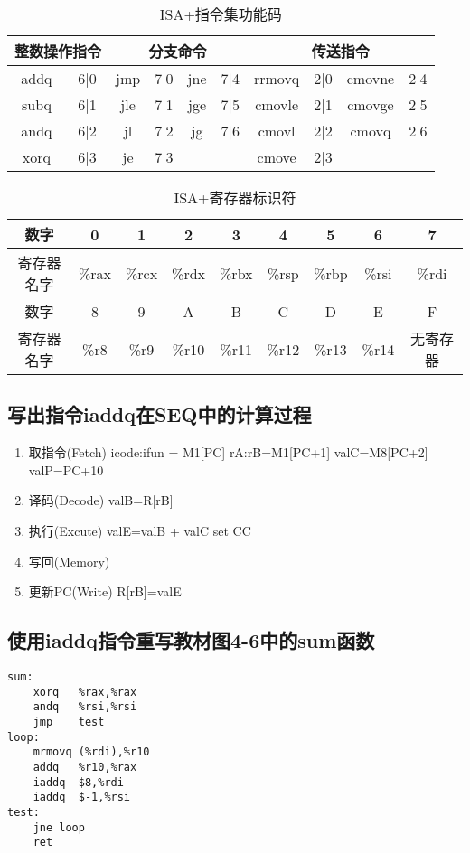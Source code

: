 \begin{table}[H]
    \centering
   \begin{tabular}{|c|c|c|c|c|c|c|c|c|c|}
       \hline 
       \multicolumn{2}{|c|}{整数操作指令} & \multicolumn{4}{|c|}{分支命令} & \multicolumn{4}{|c|}{传送指令} \\ 
       \hline 
       addq & 6|0 & jmp & 7|0 & jne & 7|4 & rrmovq & 2|0 & cmovne & 2|4 \\ 
       \hline 
       subq & 6|1 & jle & 7|1 & jge & 7|5 & cmovle & 2|1 & cmovge & 2|5 \\ 
       \hline 
       andq & 6|2 & jl & 7|2 & jg & 7|6 & cmovl & 2|2 & cmovq & 2|6 \\ 
       \hline 
       xorq & 6|3 & je & 7|3 &  &  & cmove & 2|3 &  &  \\ 
       \hline 
   \end{tabular} 
   \caption{ISA+指令集功能码}
\end{table}

\begin{table}[H]
    \centering
    \begin{tabular}{|c|c|c|c|c|c|c|c|c|}
        \hline 
        数字 & 0 & 1 & 2 & 3 & 4 & 5 & 6 & 7  \\ 
        \hline 
        寄存器名字 & \%rax & \%rcx & \%rdx & \%rbx & \%rsp & \%rbp & \%rsi & \%rdi  \\ 
        \hline 
        数字 & 8 & 9 & A & B & C & D & E & F \\
        \hline
        寄存器名字 & \%r8 & \%r9 & \%r10 & \%r11 & \%r12 & \%r13 & \%r14 & 无寄存器 \\
        \hline
    \end{tabular} 
    \caption{ISA+寄存器标识符}
\end{table}

\subsection{写出指令iaddq在SEQ中的计算过程}

\begin{enumerate}
    \item 取指令(Fetch)
    \subitem icode:ifun = M1[PC]
    \subitem rA:rB=M1[PC+1]
    \subitem valC=M8[PC+2]
    \subitem valP=PC+10
    \item 译码(Decode)
    \subitem valB=R[rB]
    \item 执行(Excute)
    \subitem valE=valB + valC
    \subitem set CC
    \item 写回(Memory)
    \item 更新PC(Write)
    \subitem R[rB]=valE
\end{enumerate}

\subsection{使用iaddq指令重写教材图4-6中的sum函数}

\begin{verbatim}
sum:
    xorq   %rax,%rax
    andq   %rsi,%rsi
    jmp    test
loop:
    mrmovq (%rdi),%r10
    addq   %r10,%rax
    iaddq  $8,%rdi
    iaddq  $-1,%rsi
test:
    jne loop
    ret
\end{verbatim}


